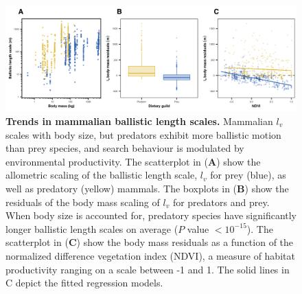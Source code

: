 \documentclass[12pt]{article}
\begin{document}
\begin{figure}[!h]
\centering
\includegraphics[scale=0.9]{Empirical_Trends.png}
\caption{\textbf{Trends in mammalian ballistic length scales.} Mammalian $l_v$ scales with body size, but predators exhibit more ballistic motion than prey species, and search behaviour is modulated by environmental productivity. The scatterplot in (\textbf{A}) show the allometric scaling of the ballistic length scale, $l_v$ for prey (blue), as well as predatory (yellow) mammals. The boxplots in (\textbf{B}) show the residuals of the body mass scaling of $l_v$ for predators and prey. When body size is accounted for, predatory species have significantly longer ballistic length scales on average ($P$ value $<10^{-15}$). The scatterplot in (\textbf{C}) show the body mass residuals as a function of the normalized difference vegetation index (NDVI), a measure of habitat productivity ranging on a scale between -1 and 1. The solid lines in C depict the fitted regression models.}
\label{fig:emp_res}
\end{figure}

\end{document}
